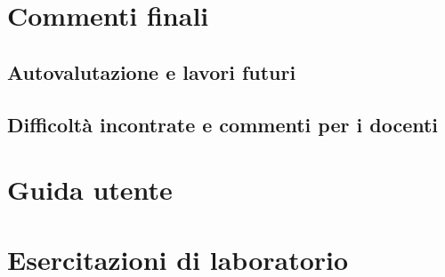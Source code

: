 \documentclass[a4paper,12pt]{report}
\begin{document}
\chapter{Commenti finali}

\section{Autovalutazione e lavori futuri}

\section{Difficoltà incontrate e commenti per i docenti}

\appendix
\chapter{Guida utente}

\chapter{Esercitazioni di laboratorio}




\end{document}
